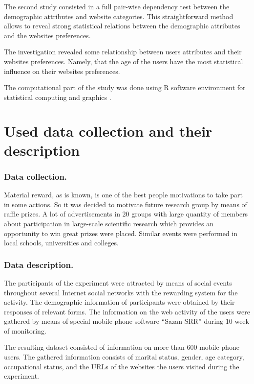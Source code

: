 \documentclass[runningheads,a4paper]{llncs}
\begin{document}
The second study consisted in a full pair-wise dependency test between the demographic attributes and website categories. This straightforward method allows to reveal strong statistical relations between the demographic attributes and the websites preferences.

The investigation revealed some relationship between users attributes and their websites preferences. Namely, that the age of the users have the most statistical influence on their websites preferences.

The computational part of the study was done using R software environment for statistical computing and graphics \cite{r-project}.


\section{Used data collection and their description}\label{the-description}


\subsubsection{Data collection.}
Material reward, as is known, is one of the best people motivations to take part in some actions. So it was decided to motivate future research group by means of raffle prizes.
A lot of advertisements in 20 groups with large quantity of members about participation in large-scale scientific research which provides an opportunity to win great prizes were placed. Similar events were performed in local schools, universities and colleges.


\subsubsection{Data description.}

The participants of the experiment were attracted by means of social events throughout several Internet social networks with the rewarding system for the activity.  The demographic information of participants were obtained by their responses of relevant forms. The information on the web activity of the users were gathered by means of special mobile phone software ``Sazan SRR'' during 10 week of monitoring.

The resulting dataset consisted of information on more than 600 mobile phone users. The gathered information consists of marital status, gender, age category, occupational status, and the URLs of the websites the users visited during the experiment.
\end{document}

